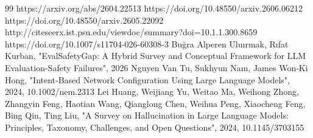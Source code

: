 \documentclass[conference]{IEEEtran}
\begin{document}
\begin{thebibliography}{99}
 https://arxiv.org/abs/2604.22513
 https://doi.org/10.48550/arxiv.2606.06212
 https://doi.org/10.48550/arxiv.2605.22092
 http://citeseerx.ist.psu.edu/viewdoc/summary?doi=10.1.1.300.8659
 https://doi.org/10.1007/s11704-026-60308-3
 Buğra Alperen Uluırmak, Rıfat Kurban, "EvalSafetyGap: A Hybrid Survey and Conceptual Framework for LLM Evaluation-Safety Failures", 2026
 Nguyen Van Tu, Sukhyun Nam, James Won‐Ki Hong, "Intent‐Based Network Configuration Using Large Language Models", 2024, 10.1002/nem.2313
 Lei Huang, Weijiang Yu, Weitao Ma, Weihong Zhong, Zhangyin Feng, Haotian Wang, Qianglong Chen, Weihua Peng, Xiaocheng Feng, Bing Qin, Ting Liu, "A Survey on Hallucination in Large Language Models: Principles, Taxonomy, Challenges, and Open Questions", 2024, 10.1145/3703155
\end{thebibliography}
\end{document}
